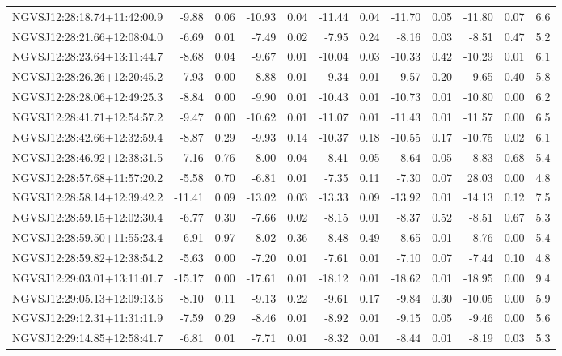 \begin{tabular}{lrrrrrrrrrrc}
NGVSJ12:28:18.74+11:42:00.9 & -9.88 & 0.06 & -10.93 & 0.04 & -11.44 & 0.04 & -11.70 & 0.05 & -11.80 & 0.07 & 6.6 \\
NGVSJ12:28:21.66+12:08:04.0 & -6.69 & 0.01 & -7.49 & 0.02 & -7.95 & 0.24 & -8.16 & 0.03 & -8.51 & 0.47 & 5.2 \\
NGVSJ12:28:23.64+13:11:44.7 & -8.68 & 0.04 & -9.67 & 0.01 & -10.04 & 0.03 & -10.33 & 0.42 & -10.29 & 0.01 & 6.1 \\
NGVSJ12:28:26.26+12:20:45.2 & -7.93 & 0.00 & -8.88 & 0.01 & -9.34 & 0.01 & -9.57 & 0.20 & -9.65 & 0.40 & 5.8 \\
NGVSJ12:28:28.06+12:49:25.3 & -8.84 & 0.00 & -9.90 & 0.01 & -10.43 & 0.01 & -10.73 & 0.01 & -10.80 & 0.00 & 6.2 \\
NGVSJ12:28:41.71+12:54:57.2 & -9.47 & 0.00 & -10.62 & 0.01 & -11.07 & 0.01 & -11.43 & 0.01 & -11.57 & 0.00 & 6.5 \\
NGVSJ12:28:42.66+12:32:59.4 & -8.87 & 0.29 & -9.93 & 0.14 & -10.37 & 0.18 & -10.55 & 0.17 & -10.75 & 0.02 & 6.1 \\
NGVSJ12:28:46.92+12:38:31.5 & -7.16 & 0.76 & -8.00 & 0.04 & -8.41 & 0.05 & -8.64 & 0.05 & -8.83 & 0.68 & 5.4 \\
NGVSJ12:28:57.68+11:57:20.2 & -5.58 & 0.70 & -6.81 & 0.01 & -7.35 & 0.11 & -7.30 & 0.07 & 28.03 & 0.00 & 4.8 \\
NGVSJ12:28:58.14+12:39:42.2 & -11.41 & 0.09 & -13.02 & 0.03 & -13.33 & 0.09 & -13.92 & 0.01 & -14.13 & 0.12 & 7.5 \\
NGVSJ12:28:59.15+12:02:30.4 & -6.77 & 0.30 & -7.66 & 0.02 & -8.15 & 0.01 & -8.37 & 0.52 & -8.51 & 0.67 & 5.3 \\
NGVSJ12:28:59.50+11:55:23.4 & -6.91 & 0.97 & -8.02 & 0.36 & -8.48 & 0.49 & -8.65 & 0.01 & -8.76 & 0.00 & 5.4 \\
NGVSJ12:28:59.82+12:38:54.2 & -5.63 & 0.00 & -7.20 & 0.01 & -7.61 & 0.01 & -7.10 & 0.07 & -7.44 & 0.10 & 4.8 \\
NGVSJ12:29:03.01+13:11:01.7 & -15.17 & 0.00 & -17.61 & 0.01 & -18.12 & 0.01 & -18.62 & 0.01 & -18.95 & 0.00 & 9.4 \\
NGVSJ12:29:05.13+12:09:13.6 & -8.10 & 0.11 & -9.13 & 0.22 & -9.61 & 0.17 & -9.84 & 0.30 & -10.05 & 0.00 & 5.9 \\
NGVSJ12:29:12.31+11:31:11.9 & -7.59 & 0.29 & -8.46 & 0.01 & -8.92 & 0.01 & -9.15 & 0.05 & -9.46 & 0.00 & 5.6 \\
NGVSJ12:29:14.85+12:58:41.7 & -6.81 & 0.01 & -7.71 & 0.01 & -8.32 & 0.01 & -8.44 & 0.01 & -8.19 & 0.03 & 5.3 \\

\end{tabular}
